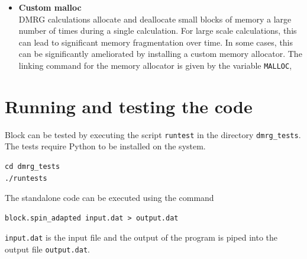 \documentclass[letterpaper,12pt,aps, pra]{revtex4-1}
\begin{document}
\begin{itemize}
	\item \textbf{Custom malloc}\\
DMRG calculations allocate and deallocate small blocks of memory a large number of times during a single calculation. For large scale calculations,
this can lead to significant memory fragmentation over time. In some cases, this can be significantly ameliorated by installing a
custom memory allocator. The linking command for the memory allocator is given by the variable \texttt{MALLOC},
\end{itemize}


\section{Running and testing the code}
Block can be tested by executing the script \texttt{runtest} in the  directory \texttt{dmrg\_tests}. The tests require Python to be installed on the system.
\begin{verbatim}
cd dmrg_tests
./runtests
\end{verbatim}

The standalone code can be executed using the command
\begin{verbatim}
block.spin_adapted input.dat > output.dat
\end{verbatim}
\texttt{input.dat} is the input file and the output of the program is piped 
into the output file \texttt{output.dat}.




\end{document}
